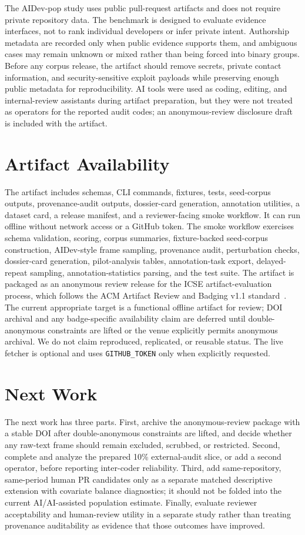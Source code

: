 \documentclass[10pt,conference]{IEEEtran}
\begin{document}
The AIDev-pop study uses public pull-request artifacts and does not require private repository data.
The benchmark is designed to evaluate evidence interfaces, not to rank individual developers or infer private intent.
Authorship metadata are recorded only when public evidence supports them, and ambiguous cases may remain unknown or mixed rather than being forced into binary groups.
Before any corpus release, the artifact should remove secrets, private contact information, and security-sensitive exploit payloads while preserving enough public metadata for reproducibility.
AI tools were used as coding, editing, and internal-review assistants during artifact preparation, but they were not treated as operators for the reported audit codes; an anonymous-review disclosure draft is included with the artifact.

\section{Artifact Availability}

The artifact includes schemas, CLI commands, fixtures, tests, seed-corpus outputs, provenance-audit outputs, dossier-card generation, annotation utilities, a dataset card, a release manifest, and a reviewer-facing smoke workflow.
It can run offline without network access or a GitHub token.
The smoke workflow exercises schema validation, scoring, corpus summaries, fixture-backed seed-corpus construction, AIDev-style frame sampling, provenance audit, perturbation checks, dossier-card generation, pilot-analysis tables, annotation-task export, delayed-repeat sampling, annotation-statistics parsing, and the test suite.
The artifact is packaged as an anonymous review release for the ICSE artifact-evaluation process, which follows the ACM Artifact Review and Badging v1.1 standard~\cite{icse2027Artifacts,acmArtifactBadging}.
The current appropriate target is a functional offline artifact for review; DOI archival and any badge-specific availability claim are deferred until double-anonymous constraints are lifted or the venue explicitly permits anonymous archival.
We do not claim reproduced, replicated, or reusable status.
The live fetcher is optional and uses \texttt{GITHUB\_TOKEN} only when explicitly requested.

\section{Next Work}

The next work has three parts.
First, archive the anonymous-review package with a stable DOI after double-anonymous constraints are lifted, and decide whether any raw-text frame should remain excluded, scrubbed, or restricted.
Second, complete and analyze the prepared 10\% external-audit slice, or add a second operator, before reporting inter-coder reliability.
Third, add same-repository, same-period human PR candidates only as a separate matched descriptive extension with covariate balance diagnostics; it should not be folded into the current AI/AI-assisted population estimate.
Finally, evaluate reviewer acceptability and human-review utility in a separate study rather than treating provenance auditability as evidence that those outcomes have improved.



\end{document}
